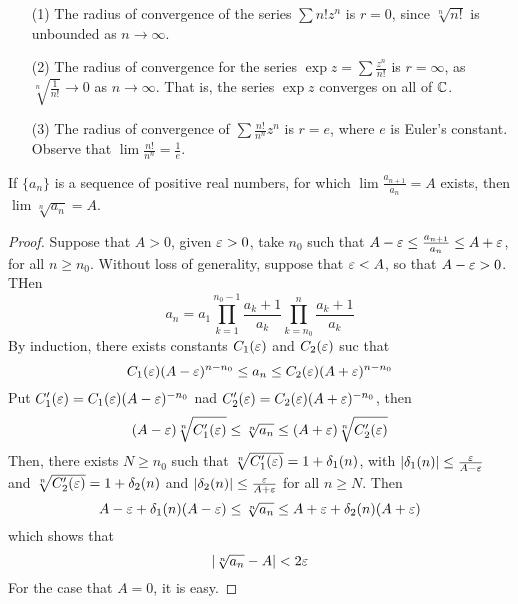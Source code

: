 \begin{example}\label{example_2.4}
    \begin{enumerate}
        \item[(1)] The radius of convergence of the series $\sum{n!z^n}$ is
            $r=0$, since $\sqrt[n]{n!}$ is unbounded as $n \xrightarrow{}
            \infty$.

        \item[(2)] The radius of convergence for the series
            $\exp{z}=\sum{\frac{z^n}{n!}}$ is $r=\infty$, as
            $\sqrt[n]{\frac{1}{n!}} \xrightarrow{} 0$ as $n \xrightarrow{}
            \infty$. That is, the series $\exp{z}$ converges on all of $\mathbb{C}$.

        \item[(3)] The radius of convergence of $\sum{\frac{n!}{n^n}}z^n$ is
            $r=e$, where $e$ is Euler's constant. Observe that
            $\lim{\frac{n!}{n^n}}=\frac{1}{e}$.
    \end{enumerate}
\end{example}

\begin{theorem}\label{2.2.12}
    If $\{a_n\}$ is a sequence of positive real numbers, for which
    $\lim{\frac{a_{n+1}}{a_n}}=A$ exists, then $\lim{\sqrt[n]{a_n}}=A$.
\end{theorem}
\begin{proof}
    Suppose that $A>0$, given  $\varepsilon>0$, take  $n_0$ such that $A-\varepsilon \leq
    \frac{a_{n+1}}{a_n} \leq A+\varepsilon$, for all $n \geq n_0$. Without loss of
    generality, suppose that $\varepsilon<A$, so that  $A-\varepsilon>0$. THen
    \begin{equation*}
        a_n=a_1\prod_{k=1}^{n_0-1}{\frac{a_k+1}{a_k}}\prod_{k=n_0}^{n}{\frac{a_k+1}{a_k}}
    \end{equation*}
    By induction, there exists constants $C_1(\varepsilon)$ and $C_2(\varepsilon)$ suc that
    \begin{equation*}
        C_1(\varepsilon)(A-\varepsilon)^{n-n_0} \leq a_n \leq C_2(\varepsilon)(A+\varepsilon)^{n-n_0}
    \end{equation*}
    Put $C_1'(\varepsilon)=C_1(\varepsilon)(A-\varepsilon)^{-n_0}$ nad $C_2'(\varepsilon)=C_2(\varepsilon)(A+\varepsilon)^{-n_0}$,
    then
    \begin{equation*}
        (A-\varepsilon)\sqrt[n]{C_1'(\varepsilon)} \leq \sqrt[n]{a_n} \leq (A+\varepsilon)\sqrt[n]{C_2'(\varepsilon)}
    \end{equation*}
    Then, there exists $N \geq n_0$ such that $\sqrt[n]{C_1'(\varepsilon)}=1+\delta_1(n)$,
    with $|\delta_1(n)| \leq \frac{\varepsilon}{A-\varepsilon}$ and  $\sqrt[n]{C_2'(\varepsilon)}=1+\delta_2(n)$
    and $|\delta_2(n)| \leq \frac{\varepsilon}{A+\varepsilon}$ for all  $n \geq N$. Then
    \begin{equation*}
        A-\varepsilon+\delta_1(n)(A-\varepsilon) \leq \sqrt[n]{a_n} \leq A+\varepsilon+\delta_2(n)(A+\varepsilon)
    \end{equation*}
    which shows that
    \begin{equation*}
        |\sqrt[n]{a_n}-A|<2\varepsilon
    \end{equation*}
    For the case that $A=0$, it is easy.
\end{proof}

